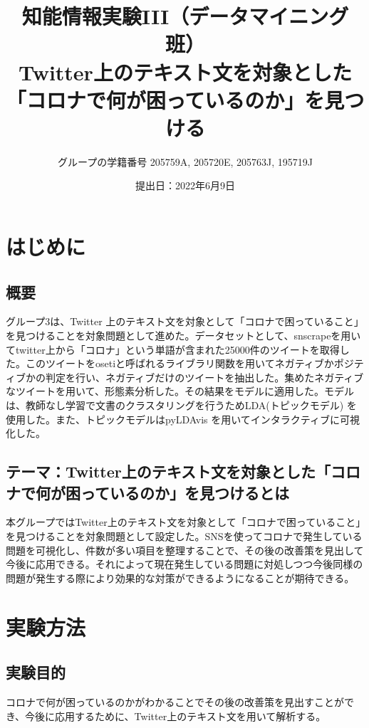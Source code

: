 \documentclass[a4paper, 11pt, titlepage]{jsarticle}
\title{知能情報実験III（データマイニング班）\\Twitter上のテキスト文を対象とした「コロナで何が困っているのか」を見つける}
\author{グループの学籍番号 205759A, 205720E, 205763J, 195719J}
\date{提出日：2022年6月9日}
\begin{document}
\maketitle
\tableofcontents
\clearpage

\section{はじめに}
\subsection{概要}
グループ3は、Twitter 上のテキスト文を対象として「コロナで困っていること」を見つけることを対象問題として進めた。データセットとして、snscrapeを用いてtwitter上から「コロナ」という単語が含まれた25000件のツイートを取得した。このツイートをosetiと呼ばれるライブラリ関数を用いてネガティブかポジティブかの判定を行い、ネガティブだけのツイートを抽出した。集めたネガティブなツイートを用いて、形態素分析した。その結果をモデルに適用した。モデルは、教師なし学習で文書のクラスタリングを行うためLDA(トピックモデル) を使用した。また、トピックモデルはpyLDAvis を用いてインタラクティブに可視化した。

\subsection{テーマ：Twitter上のテキスト文を対象とした「コロナで何が困っているのか」を見つけるとは}
本グループではTwitter上のテキスト文を対象として「コロナで困っていること」を見つけることを対象問題として設定した。SNSを使ってコロナで発生している問題を可視化し、件数が多い項目を整理することで、その後の改善策を見出して今後に応用できる。それによって現在発生している問題に対処しつつ今後同様の問題が発生する際により効果的な対策ができるようになることが期待できる。

\section{実験方法}
\subsection{実験目的}
コロナで何が困っているのかがわかることでその後の改善策を見出すことができ、今後に応用するために、Twitter上のテキスト文を用いて解析する。


\end{document}

